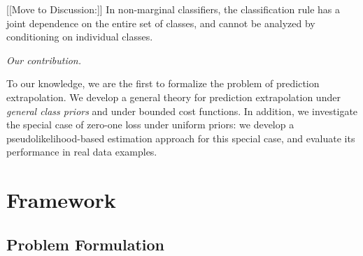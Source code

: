 \documentclass[12pt]{article}
\begin{document}
[[Move to Discussion:]]
In non-marginal classifiers, the classification rule has
a joint dependence on the entire set of classes, and cannot be
analyzed by conditioning on individual classes.
\newline

\noindent\emph{Our contribution.}

To our knowledge, we are the first to formalize the problem of
prediction extrapolation.  We develop a general theory for prediction
extrapolation under \emph{general class priors} and under bounded cost
functions.  In addition, we investigate the special case of zero-one
loss under uniform priors: we develop a pseudolikelihood-based
estimation approach for this special case, and evaluate its
performance in real data examples.







\section{Framework}\label{sec:formulation}

\subsection{Problem Formulation}
\end{document}
